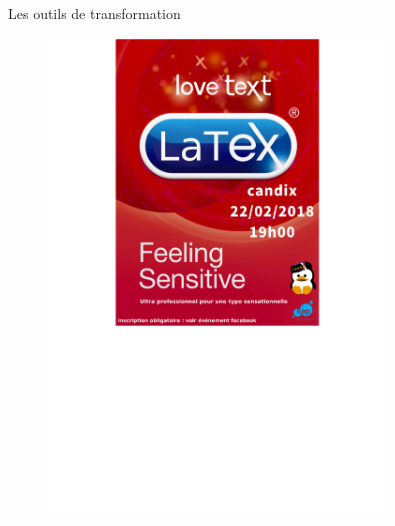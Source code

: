 \begin{frame}{Les outils de transformation}
\begin{overprint}
\begin{enumerate}
{				\begin{minipage}{0.45\textwidth}
				\begin{figure}
				    	\centering
				    	\includegraphics[width=0.8\textwidth]{Images/NoShear.png}
				\end{figure}
				\end{minipage}\hfill
				\begin{minipage}{0.45\textwidth}
				\begin{figure}
				    	\centering

\end{figure}
\end{minipage}}
\end{enumerate}
\end{overprint}
\end{frame}
